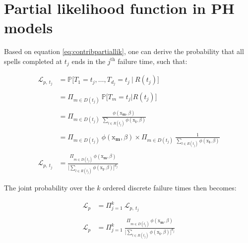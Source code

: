 \documentclass[
]{book}
\begin{document}
\hypertarget{partial-likelihood-function-in-ph-models}{%
\section*{Partial likelihood function in PH models}\label{partial-likelihood-function-in-ph-models}}

Based on equation \eqref{eq:contribpartiallik}, one can derive the probability that all spells completed at \(t_j\) ends in the \(j^{\text{th}}\) failure time, such that:

\begin{equation}
\begin{aligned}
  \mathcal{L}_{p,\ t_j} & = \mathbb{P}\big[T_1 = t_j, \dots, T_{d_j} = t_j \ | \ R(t_j)\big] \\\\
  & = \Pi_{m \in D(t_j)} \ \mathbb{P}\big[T_m = t_j | R(t_j) \big] \\\\
  & = \Pi_{m \in D(t_j)} \ \frac{\phi(\pmb{\mathrm{x}_m}, \beta)}{\sum_{l \in R(t_j)} \phi(\pmb{\mathrm{x}_l}, \beta)} \\\\
  & = \Pi_{m \in D(t_j)} \ \phi(\pmb{\mathrm{x}_m}, \beta) \times \Pi_{m \in D(t_j)} \ \frac{1}{\sum_{l \in R(t_j)} \phi(\pmb{\mathrm{x}_l}, \beta)} \\\\
  \mathcal{L}_{p,\ t_j} & = \frac{\Pi_{m \in D(t_j)} \ \phi(\pmb{\mathrm{x}_m}, \beta)}{\Big[\sum_{l \in R(t_j)} \phi(\pmb{\mathrm{x}_l}, \beta)\Big]^{d_j}}
\end{aligned}
\label{eq:partlikproof}
\end{equation}

The joint probability over the \(k\) ordered discrete failure times then becomes:

\begin{equation}
\begin{aligned}
  \mathcal{L}_p & = \Pi_{j=1}^{k} \ \mathcal{L}_{p,\ t_j} \\\\
  \mathcal{L}_p & = \Pi_{j=1}^{k} \ \frac{\Pi_{m \in D(t_j)} \ \phi(\pmb{\mathrm{x}_m}, \beta)}{\Big[\sum_{l \in R(t_j)} \phi(\pmb{\mathrm{x}_l}, \beta)\Big]^{d_j}}
\end{aligned}
\label{eq:partlikproofbis}
\end{equation}

  
\end{document}
